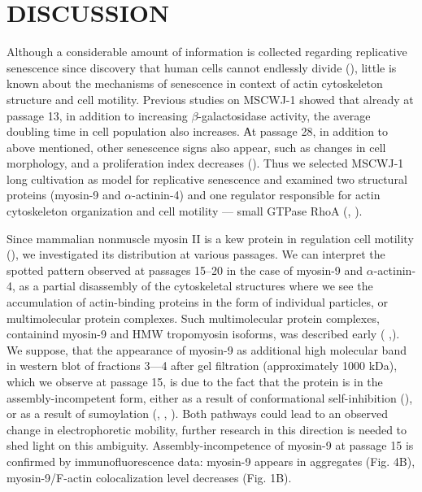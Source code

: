 \documentclass[alpha-refs]{wiley-article}
\begin{document}
\section{DISCUSSION}

Although a considerable amount of information is collected regarding replicative senescence since discovery that human cells cannot endlessly divide (\cite{hayflick1961serial}), little is known about the mechanisms of senescence in context of actin cytoskeleton structure and cell motility.
Previous studies on MSCWJ-1 showed that already at passage 13, in addition to increasing $\beta$-galactosidase activity, the average doubling time in cell population also increases.
Аt passage 28, in addition to above mentioned, other senescence signs also appear, such as changes in cell morphology, and a proliferation index decreases (\cite{koltsova2018dynamics}).
Thus we selected MSCWJ-1  long cultivation as model for replicative senescence and examined two structural proteins (myosin-9 and $\alpha$-actinin-4) and one regulator responsible for actin cytoskeleton organization and cell motility --- small GTPase RhoA (\cite{wang2003regulation}, \cite{elliott2015myosin}).

Since mammalian nonmuscle myosin II is a kew protein in regulation cell motility (\cite{shutova2018mammalian}), we investigated its distribution at various passages.
We can interpret the spotted pattern observed at passages 15--20 in the case of myosin-9 and $\alpha$-actinin-4, as a partial disassembly of the cytoskeletal structures where we see the accumulation of actin-binding proteins in the form of individual particles, or multimolecular protein complexes.
Such multimolecular protein complexes, containind myosin-9 and HMW tropomyosin isoforms, was described early (\cite{grenklo2008tropomyosin} ,\cite{bobkov2017effect}).
We suppose, that the appearance of myosin-9 as additional high molecular band in western blot of fractions 3---4 after gel filtration (approximately 1000 kDa), which we observe at passage 15, is due to the fact that the protein is in the assembly-incompetent form, either as a result of conformational self-inhibition (\cite{vicente2009non}), or as a result of sumoylation (\cite{hofmann2009sumoylation}, \cite{alonso2015emerging}, \cite{salah2016chaperone}).
Both pathways could lead to an observed change in electrophoretic mobility, further research in this direction is needed to shed light on this ambiguity.
Assembly-incompetence of myosin-9 at passage 15 is confirmed by immunofluorescence data: myosin-9 appears in aggregates (Fig. 4B), myosin-9/F-actin colocalization level decreases (Fig. 1B).
\end{document}
